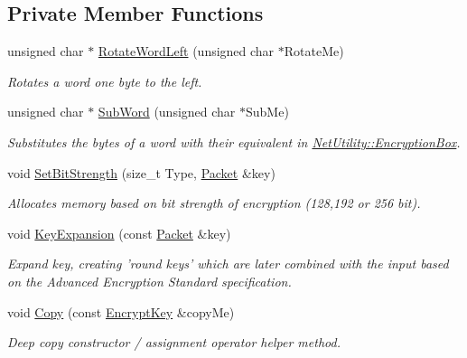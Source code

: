 \subsection*{Private Member Functions}
\begin{DoxyCompactItemize}
\item 
unsigned char $\ast$ \hyperlink{class_encrypt_key_aff2332925a10008a1c673cf60735ab41}{RotateWordLeft} (unsigned char $\ast$RotateMe)
\begin{DoxyCompactList}\small\item\em Rotates a word one byte to the left. \item\end{DoxyCompactList}\item 
unsigned char $\ast$ \hyperlink{class_encrypt_key_ae996e161d82a17d8d32129e4afda0f39}{SubWord} (unsigned char $\ast$SubMe)
\begin{DoxyCompactList}\small\item\em Substitutes the bytes of a word with their equivalent in \hyperlink{class_net_utility_a4c0093017521d888c4510cc940ffa335}{NetUtility::EncryptionBox}. \item\end{DoxyCompactList}\item 
void \hyperlink{class_encrypt_key_a022b65113b943a67bdc909bf4bee9e6c}{SetBitStrength} (size\_\-t Type, \hyperlink{class_packet}{Packet} \&key)
\begin{DoxyCompactList}\small\item\em Allocates memory based on bit strength of encryption (128,192 or 256 bit). \item\end{DoxyCompactList}\item 
void \hyperlink{class_encrypt_key_a6a3608ebb86c921994d6158c32797fcd}{KeyExpansion} (const \hyperlink{class_packet}{Packet} \&key)
\begin{DoxyCompactList}\small\item\em Expand key, creating 'round keys' which are later combined with the input based on the Advanced Encryption Standard specification. \item\end{DoxyCompactList}\item 
void \hyperlink{class_encrypt_key_a14200c0afeec7da371cabced0b32ce28}{Copy} (const \hyperlink{class_encrypt_key}{EncryptKey} \&copyMe)
\begin{DoxyCompactList}\small\item\em Deep copy constructor / assignment operator helper method. \item\end{DoxyCompactList}\end{DoxyCompactItemize}
